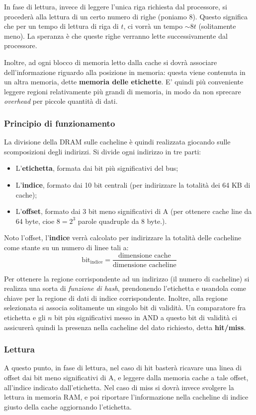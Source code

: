 \documentclass[a4paper,11pt]{article}
\begin{document}
In fase di lettura, invece di leggere l'unica riga richiesta dal processore, si procederà alla lettura di un certo numero di righe (poniamo 8).
Questo significa che per un tempo di lettura di riga di $t$, ci vorrà un tempo $\sim 8t$ (solitamente meno).
La speranza è che queste righe verranno lette successivamente dal processore.

Inoltre, ad ogni blocco di memoria letto dalla cache si dovrà associare dell'informazione riguardo alla posizione in memoria: questa viene contenuta in un altra memoria, dette \textbf{memoria delle etichette}.
E' quindi più conveniente leggere regioni relativamente più grandi di memoria, in modo da non sprecare \textit{overhead} per piccole quantità di dati.

\subsubsection{Principio di funzionamento}
La divisione della DRAM sulle cacheline è quindi realizzata giocando sulle scomposizioni degli indirizzi.
Si divide ogni indirizzo in tre parti:
\begin{itemize}
	\item L'\textbf{etichetta}, formata dai bit più significativi del bus;
	\item L'\textbf{indice}, formato dai 10 bit centrali (per indirizzare la totalità dei 64 KB di cache);
	\item L'\textbf{offset}, formato dai 3 bit meno significativi di A (per ottenere cache line da 64 byte, cioe $8 = 2^3$ parole quadruple da 8 byte.). 
\end{itemize}

Noto l'offset, l'\textbf{indice} verrà calcolato per indirizzare la totalità delle cacheline come stante su un numero di linee tali a:
$$
\mathrm{bit}_{\mathrm{indice}} = \frac{\text{dimensione cache}}{\text{dimensione cacheline}}
$$

Per ottenere la regione corrispondente ad un indirizzo (il numero di cacheline) si realizza una sorta di \textit{funzione di hash}, prendonendo l'etichetta e usandola come chiave per la regione di dati di indice corrispondente.
Inoltre, alla regione selezionata si associa solitamente un singolo bit di validità.
Un comparatore fra etichetta e gli $n$ bit piu significativi messo in AND a questo bit di validità ci assicurerà quindi la presenza nella cacheline del dato richiesto, detta \textbf{hit/miss}.

\subsubsection{Lettura}
A questo punto, in fase di lettura, nel caso di hit basterà ricavare una linea di offset dai bit meno significativi di A, e leggere dalla memoria cache a tale offset, all'indice indicato dall'etichetta.
Nel caso di miss si dovrà invece svolgere la lettura in memoria RAM, e poi riportare l'informazione nella cacheline di indice giusto della cache aggiornando l'etichetta.
\end{document}
